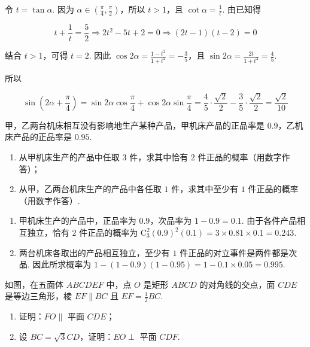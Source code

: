 \begin{solution}
令 \(t=\tan\alpha\). 因为 \(\alpha\in\left(\frac{\pi}{4},\frac{\pi}{2}\right)\)，所以 \(t>1\)，且 \(\cot\alpha=\frac{1}{t}\). 由已知得

\[
t+\frac{1}{t}=\frac{5}{2}\Longrightarrow 2t^{2}-5t+2=0\Longrightarrow (2t-1)(t-2)=0
\]

结合 \(t>1\)，可得 \(t=2\). 因此 \(\cos 2\alpha=\frac{1-t^{2}}{1+t^{2}}=-\frac{3}{5}\)，且
\(\sin 2\alpha=\frac{2t}{1+t^{2}}=\frac{4}{5}\).

所以

\[
\sin\left(2\alpha+\frac{\pi}{4}\right)=\sin 2\alpha\cos\frac{\pi}{4}+\cos 2\alpha\sin\frac{\pi}{4}=\frac{4}{5}\cdot\frac{\sqrt{2}}{2}-\frac{3}{5}\cdot\frac{\sqrt{2}}{2}=\frac{\sqrt{2}}{10}
\]
\end{solution}

\begin{problem}
甲，乙两台机床相互没有影响地生产某种产品，甲机床产品的正品率是 \(0.9\)，乙机床产品的正品率是 \(0.95\).

\begin{enumerate}
\item 从甲机床生产的产品中任取 \(3\) 件，求其中恰有 \(2\) 件正品的概率（用数字作答）；
\item 从甲，乙两台机床生产的产品中各任取 \(1\) 件，求其中至少有 \(1\) 件正品的概率（用数字作答）.
\end{enumerate}
\end{problem}

\begin{solution}
\begin{enumerate}
\item 甲机床生产的产品中，正品率为 \(0.9\)，次品率为 \(1-0.9=0.1\). 由于各件产品相互独立，恰有 \(2\) 件正品的概率为
\(\mathrm C_{3}^{2}(0.9)^{2}(0.1)=3\times 0.81\times 0.1=0.243\).

\item 两台机床各取出的产品相互独立，至少有 \(1\) 件正品的对立事件是两件都是次品. 因此所求概率为
\(1-(1-0.9)(1-0.95)=1-0.1\times 0.05=0.995\).
\end{enumerate}
\end{solution}

\begin{problem}
如图，在五面体 \(ABCDEF\) 中，点 \(O\) 是矩形 \(ABCD\) 的对角线的交点，面 \(CDE\) 是等边三角形，棱 \(EF \parallel BC\) 且 \(EF = \frac{1}{2}BC\).

\begin{enumerate}
\item 证明：\(FO \parallel\) 平面 \(CDE\)；
\item 设 \(BC = \sqrt{3}CD\)，证明：\(EO \perp\) 平面 \(CDF\).
\end{enumerate}

\end{problem}

